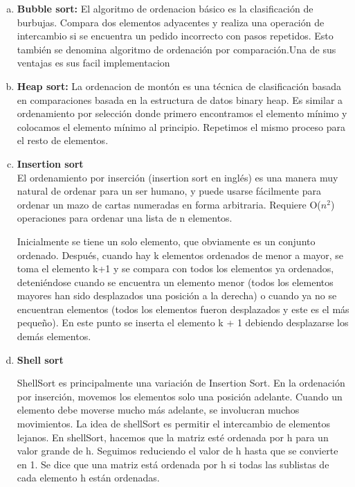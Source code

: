 \documentclass[a4paper]{article}
\begin{document}
\begin{enumerate}[a)]

\item \textbf{Bubble sort:}
El algoritmo de ordenacion básico es la clasificación de burbujas. Compara dos elementos adyacentes y realiza una operación de intercambio si se encuentra un pedido incorrecto con pasos repetidos. Esto también se denomina algoritmo de ordenación  por comparación.Una de sus ventajas es sus facil  implementacion 

\item \textbf{Heap sort:}
La ordenacion de montón es una técnica de clasificación basada en comparaciones basada en la estructura de datos binary heap. Es similar a ordenamiento por selección donde primero encontramos el elemento mínimo y colocamos el elemento mínimo al principio. Repetimos el mismo proceso para el resto de elementos\cite{heap}.

\item \textbf{Insertion sort}
\\
El ordenamiento por inserción (insertion sort en inglés) es una manera muy natural de ordenar para un ser humano, y puede usarse fácilmente para ordenar un mazo de cartas numeradas en forma arbitraria. Requiere O($n^{2}$) operaciones para ordenar una lista de  n elementos.

Inicialmente se tiene un solo elemento, que obviamente es un conjunto ordenado. Después, cuando hay  k elementos ordenados de menor a mayor, se toma el elemento k+1 y se compara con todos los elementos ya ordenados, deteniéndose cuando se encuentra un elemento menor (todos los elementos mayores han sido desplazados una posición a la derecha) o cuando ya no se encuentran elementos (todos los elementos fueron desplazados y este es el más pequeño). En este punto se inserta el elemento k + 1 debiendo desplazarse los demás elementos\cite{inser}.

\item \textbf{ Shell sort}

ShellSort es principalmente una variación de Insertion Sort. En la ordenación por inserción, movemos los elementos solo una posición adelante. Cuando un elemento debe moverse mucho más adelante, se involucran muchos movimientos. La idea de shellSort es permitir el intercambio de elementos lejanos. En shellSort, hacemos que la matriz esté ordenada por h para un valor grande de h. Seguimos reduciendo el valor de h hasta que se convierte en 1. Se dice que una matriz está ordenada por h si todas las sublistas de cada elemento h están ordenadas\cite{shell}.


\end{enumerate}
\end{document}
